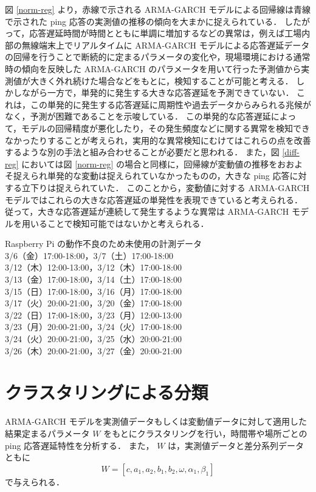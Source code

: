\documentclass[technicalreport]{ieicej}
\begin{document}
図 \ref{norm-reg} より，赤線で示される ARMA-GARCH モデルによる回帰線は青線で示された ping 応答の実測値の推移の傾向を大まかに捉えられている．
したがって，応答遅延時間が時間とともに単調に増加するなどの異常は，例えば工場内部の無線端末上でリアルタイムに ARMA-GARCH モデルによる応答遅延データの回帰を行うことで断続的に定まるパラメータの変化や，現場環境における通常時の傾向を反映した ARMA-GARCH のパラメータを用いて行った予測値から実測値が大きく外れ続けた場合などをもとに，検知することが可能と考える．
しかしながら一方で，単発的に発生する大きな応答遅延を予測できていない．
これは，この単発的に発生する応答遅延に周期性や過去データからみられる兆候がなく，予測が困難であることを示唆している．
この単発的な応答遅延によって，モデルの回帰精度が悪化したり，その発生頻度などに関する異常を検知できなかったりすることが考えられ，実用的な異常検知にむけてはこれらの点を改善するような別の手法と組み合わせることが必要だと思われる．
また，図 \ref{diff-reg} においては図 \ref{norm-reg} の場合と同様に，回帰線が変動値の推移をおおよそ捉えられ単発的な変動は捉えられていなかったものの，大きな ping 応答に対する立下りは捉えられていた．
このことから，変動値に対する ARMA-GARCH モデルではこれらの大きな応答遅延の単発性を表現できていると考えられる．
従って，大きな応答遅延が連続して発生するような異常は ARMA-GARCH モデルを用いることで検知可能ではないかと考えられる．

\begin{center}
Raspberry Pi の動作不良のため未使用の計測データ\\
3/6（金）17:00-18:00，3/7（土）17:00-18:00\\
3/12（木）12:00-13:00，3/12（木）17:00-18:00\\
3/13（金）17:00-18:00，3/14（土）17:00-18:00\\
3/15（日）17:00-18:00，3/16（月）17:00-18:00\\
3/17（火）20:00-21:00，3/20（金）17:00-18:00\\
3/22（日）17:00-18:00，3/23（月）12:00-13:00\\
3/23（月）20:00-21:00，3/24（火）17:00-18:00\\
3/24（火）20:00-21:00，3/25（水）20:00-21:00\\
3/26（木）20:00-21:00，3/27（金）20:00-21:00\\
\end{center}
\section{クラスタリングによる分類}
 ARMA-GARCH モデルを実測値データもしくは変動値データに対して適用した結果定まるパラメータ $W$ をもとにクラスタリングを行い，時間帯や場所ごとの ping 応答遅延特性を分析する．
また， $W$ は，実測値データと差分系列データともに
$$W = [c, a_1, a_2, b_1, b_2, \omega, \alpha_1, \beta_1] $$
で与えられる．




\end{document}

